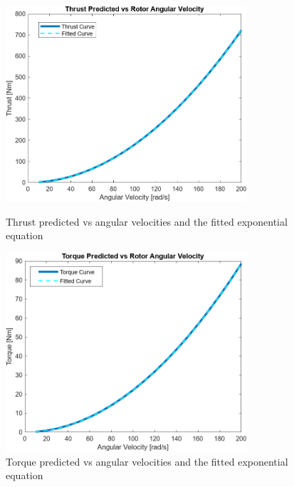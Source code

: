         \begin{figure}[H]
            \centering
            \begin{minipage}{0.45\textwidth}
                \centering
                \includegraphics[width=0.8\textwidth]{figs/Model/Rotor/Thrust_Vs_Rotor_Angular_Velocity.png}
                \caption[Rotor thrust vs angular velocity]{Thrust predicted vs angular velocities and the fitted exponential equation}
                \label{fig: thrust_vs_angular_velocity}
            \end{minipage}\hfill
            \begin{minipage}{0.45\textwidth}
                \centering
                \includegraphics[width=0.8\textwidth]{figs/Model/Rotor/Torque_Vs_Rotor_Angular_Velocity.png}
                \caption[Rotor torque vs angular velocity]{Torque predicted vs angular velocities and the fitted exponential equation}
                \label{fig: torque_vs_angular_velocity}
            \end{minipage}
        \end{figure}
